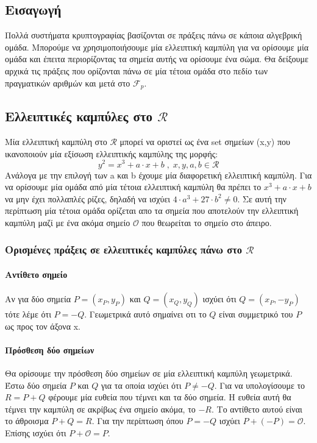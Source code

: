 \documentclass[12pt]{article}
\begin{document}
\subsection{Εισαγωγή}
Πολλά συστήματα κρυπτογραφίας βασίζονται σε  πράξεις πάνω σε κάποια αλγεβρική ομάδα. Μπορούμε να χρησιμοποιήσουμε μία ελλειπτική καμπύλη για να ορίσουμε μία ομάδα και έπειτα περιορίζοντας τα σημεία αυτής να ορίσουμε ένα σώμα. Θα δείξουμε αρχικά τις πράξεις που ορίζονται πάνω σε μία τέτοια ομάδα στο πεδίο των πραγματικών αριθμών και μετά στο $\mathcal{F}_p$.
\subsection{Ελλειπτικές καμπύλες στο $\mathcal{R}$}
Μία ελλειπτική καμπύλη στο $\mathcal{R}$ μπορεί να οριστεί ως ένα set σημείων (x,y) που ικανοποιούν μία εξίσωση ελλειπτικής καμπύλης της μορφής: 
$$y^2 = x^3 + a \cdot x + b \; , \; x,y,a,b \in \mathcal{R}$$
Ανάλογα με την επιλογή των a και b έχουμε μία διαφορετική ελλειπτική καμπύλη. Για να ορίσουμε μία ομάδα από μία τέτοια ελλειπτική καμπύλη θα πρέπει το $x^3 + a \cdot x + b$ να μην έχει πολλαπλές ρίζες, δηλαδή να ισχύει $4 \cdot a^3 + 27 \cdot b^2 \neq 0$. Σε αυτή την περίπτωση μία τέτοια ομάδα ορίζεται απο τα σημεία που αποτελούν την ελλειπτική καμπύλη μαζί με ένα ακόμα σημείο $\mathcal{O}$ που θεωρείται το σημείο στο άπειρο.
\subsubsection{Ορισμένες πράξεις σε ελλειπτικές καμπύλες πάνω στο $\mathcal{R}$}
\paragraph{Αντίθετο σημείο}
Αν για δύο σημεία $P = (x_P, y_P)$ και $Q = (x_Q, y_Q)$ ισχύει ότι $Q = (x_P, -y_P)$ τότε λέμε ότι $P = -Q$. Γεωμετρικά αυτό σημαίνει οτι το $Q$ είναι συμμετρικό του $P$ ως προς τον άξονα x.
\paragraph{Πρόσθεση δύο σημείων}
Θα ορίσουμε την πρόσθεση δύο σημείων σε μία ελλειπτική καμπύλη γεωμετρικά. Έστω δύο σημεία $P$ και $Q$ για τα οποία ισχύει ότι $P \neq -Q$. Για να υπολογίσουμε το $R = P + Q$ φέρουμε μία ευθεία που τέμνει και τα δύο σημεία. Η ευθεία αυτή θα τέμνει την καμπύλη σε ακρίβως ένα σημείο ακόμα, το $-R$. Το αντίθετο αυτού είναι το άθροισμα $P+Q = R$. 
Για την περίπτωση όπου $P = -Q$ ισχύει $P + (-P) = \mathcal{O}$.
Επίσης ισχύει ότι $P +\mathcal{O} = P$.
\end{document}
